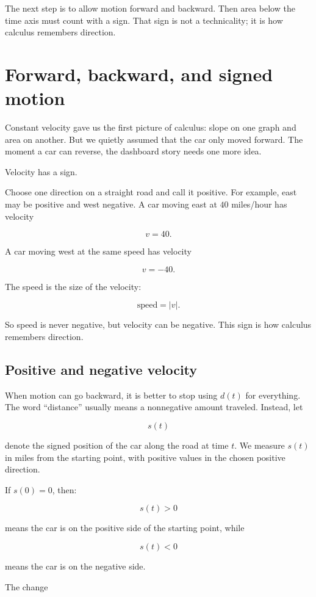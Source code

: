 The next step is to allow motion forward and backward. Then area below the time axis must count with a sign. That sign is not a technicality; it is how calculus remembers direction.
\section{Forward, backward, and signed motion}
\label{sec:signed-motion}

Constant velocity gave us the first picture of calculus: slope on one graph and area on another. But we quietly assumed that the car only moved forward. The moment a car can reverse, the dashboard story needs one more idea.

Velocity has a sign.

Choose one direction on a straight road and call it positive. For example, east may be positive and west negative. A car moving east at \(40\) miles/hour has velocity

\[
v=40.
\]

A car moving west at the same speed has velocity

\[
v=-40.
\]

The speed is the size of the velocity:

\[
\text{speed}=|v|.
\]

So speed is never negative, but velocity can be negative. This sign is how calculus remembers direction.

\subsection{Positive and negative velocity}

When motion can go backward, it is better to stop using \(d(t)\) for everything. The word ``distance'' usually means a nonnegative amount traveled. Instead, let

\[
s(t)
\]

denote the signed position of the car along the road at time \(t\). We measure \(s(t)\) in miles from the starting point, with positive values in the chosen positive direction.

If \(s(0)=0\), then:

\[
s(t)>0
\]

means the car is on the positive side of the starting point, while

\[
s(t)<0
\]

means the car is on the negative side.

The change

